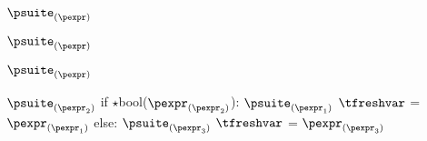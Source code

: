 \documentclass{article}
\begin{document}
\begin{mathpar}
\end{mathpar}

\newsavebox{\notBox}
\begin{lrbox}{\notBox}
\begin{python}
$\psuite_{(\pexpr)}$
\end{python}
\end{lrbox}

\begin{mathpar}
\end{mathpar}

\newsavebox{\uplusBox}
\begin{lrbox}{\uplusBox}
\begin{python}
$\psuite_{(\pexpr)}$
\end{python}
\end{lrbox}

\begin{mathpar}
\end{mathpar}

\newsavebox{\usubBox}
\begin{lrbox}{\usubBox}
\begin{python}
$\psuite_{(\pexpr)}$
\end{python}
\end{lrbox}

\begin{mathpar}
\end{mathpar}

\newsavebox{\ifExpBox}
\begin{lrbox}{\ifExpBox}
\begin{python}
$\psuite_{(\pexpr_2)}$
if $\star$bool($\pexpr_{(\pexpr_2)}$):
  $\psuite_{(\pexpr_1)}$
  $\tfreshvar$ = $\pexpr_{(\pexpr_1)}$
else:
  $\psuite_{(\pexpr_3)}$
  $\tfreshvar$ = $\pexpr_{(\pexpr_3)}$
\end{python}
\end{lrbox}
\end{document}
